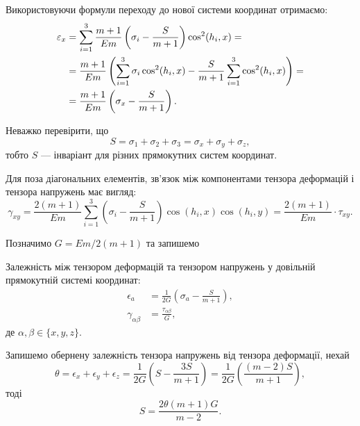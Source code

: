 Використовуючи формули переходу до нової системи координат отримаємо:
\begin{equation}
	\begin{aligned}
		\varepsilon_x &= \displaystyle\sum\limits_{i = 1}^3 \frac{m + 1}{E m} \left( \sigma_i - \frac{S}{m + 1} \right) \cos^2( h_i, x ) = \\
		&= \frac{m + 1}{E m} \left(\displaystyle\sum\limits_{i = 1}^3 \sigma_i \cos^2(h_i, x) - \frac{S}{m + 1} \displaystyle\sum\limits_{i = 1}^3 \cos^2(h_i, x)\right) =\\
		&= \frac{m + 1}{E m} \left( \sigma_x - \frac{S}{m + 1} \right).
	\end{aligned}
\end{equation}

Неважко перевірити, що 
\begin{equation}
	S = \sigma_1 + \sigma_2 + \sigma_3 = \sigma_x + \sigma_y + \sigma_z,
\end{equation}
тобто $S$ --- інваріант для різних прямокутних систем координат. \medskip

Для поза діагональних елементів, зв'язок між компонентами тензора деформацій і тензора напружень має вигляд:
\begin{equation}
	\gamma_{x y} = \frac{2 (m + 1)}{E m} \sum_{i = 1}^3 \left( \sigma_i - \frac{S}{m + 1} \right) \cos (h_i, x) \cos (h_i, y) = \frac{2 (m + 1)}{E m} \cdot \tau_{x y}.
\end{equation}
 
Позначимо $G = E m / 2 (m + 1)$ та запишемо 
\begin{law}
	Залежність між тензором деформацій та тензором напружень у довільній прямокутній системі координат:
	\begin{align}
		\epsilon_a &= \frac{1}{2 G} \left(\sigma_a - \frac{S}{m + 1}\right), \\
		\gamma_{\alpha \beta} &= \frac{\tau_{\alpha \beta}}{G},
	\end{align}
	де $\alpha, \beta \in \{x, y, z\}$.
\end{law}

Запишемо обернену залежність тензора напружень від тензора деформації, нехай
\begin{equation}
	\theta = \epsilon_x + \epsilon_y + \epsilon_z = \frac{1}{2G} \left( S - \frac{3 S}{m + 1} \right) = \frac{1}{2 G} \left( \frac{(m - 2) S}{m +1} \right),
\end{equation}
тоді
\begin{equation}
	S = \frac{2 \theta (m + 1) G}{m - 2}.
\end{equation}

